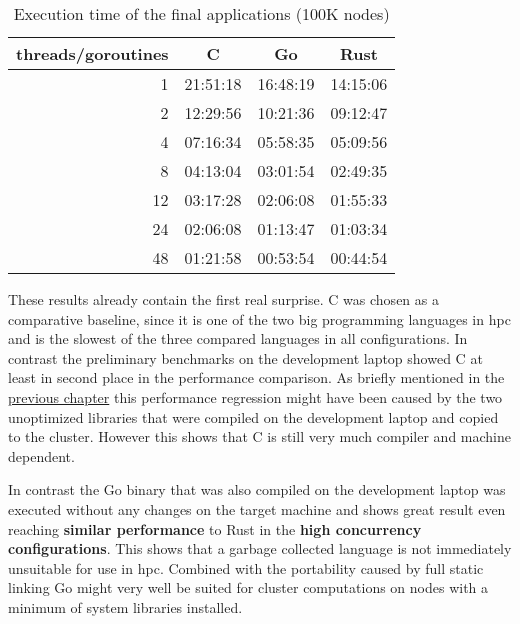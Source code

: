 \begin{table}[htb]
    \centering
    \begin{tabular}{rccc}
        \toprule
            threads/goroutines
            & C
            & Go
            & Rust \\
        \midrule

            1
            & 21:51:18
            & 16:48:19
            & 14:15:06 \\

            2
            & 12:29:56
            & 10:21:36
            & 09:12:47 \\

            4
            & 07:16:34
            & 05:58:35
            & 05:09:56 \\

            8
            & 04:13:04
            & 03:01:54
            & 02:49:35 \\

            12
            & 03:17:28
            & 02:06:08
            & 01:55:33 \\

            24
            & 02:06:08
            & 01:13:47
            & 01:03:34 \\

            48
            & 01:21:58
            & 00:53:54
            & 00:44:54 \\

        \bottomrule
    \end{tabular}
    \caption{Execution time of the final applications (100K nodes)}
    \label{tb:final_execution_time}
\end{table}

These results already contain the first real surprise. C was chosen as a comparative baseline, since it is one of the two big programming languages in \gls{hpc} and is the slowest of the three compared languages in all configurations. In contrast the preliminary benchmarks on the development laptop showed C at least in second place in the performance comparison. As briefly mentioned in the \hyperref[subsec:Implementation::ClusterPreparation::C]{previous chapter} this performance regression might have been caused by the two unoptimized libraries that were compiled on the development laptop and copied to the cluster. However this shows that C is still very much compiler and machine dependent.

In contrast the Go binary that was also compiled on the development laptop was executed without any changes on the target machine and shows great result even reaching \textbf{similar performance} to Rust in the \textbf{high concurrency configurations}. This shows that a garbage collected language is not immediately unsuitable for use in \gls{hpc}. Combined with the portability caused by full static linking Go might very well be suited for cluster computations on nodes with a minimum of system libraries installed.

